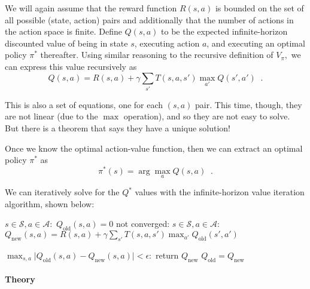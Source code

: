 We will again assume that the reward function $R(s,a)$ is bounded on the
set of all possible (state, action) pairs and additionally that the number
of actions in the action space is finite.
Define $Q(s, a)$ to be the expected infinite-horizon discounted
value of being in state $s$, executing action $a$, and executing
an optimal policy $\pi^*$ thereafter. Using similar reasoning to the
recursive definition of $V_\pi,$ we can express this value
recursively as
\begin{equation}
  Q(s, a) = R(s, a) + \gamma\sum_{s'}T(s, a, s')\max_{a'}Q(s',
  a') \;\;.
\end{equation}

This is also a set of equations, one for each $(s, a)$ pair.  This
time, though, they are not linear (due to the $\max$ operation), and so
they are not easy to solve.  But there is a theorem that says they
have a unique solution!

Once we know the optimal action-value function, then we can extract an
optimal policy $\pi^*$ as
\begin{equation}
  \pi^*(s) = \arg\max_{a}Q(s, a) \;\;.
\end{equation}

We can iteratively solve for the $Q^*$ values with the
infinite-horizon value iteration algorithm, shown below:

\begin{codebox}
  \li     \For $s \in \mathcal{S}, a \in \mathcal{A}:$
  \Do
  \li        $Q_{\text{old}}(s, a) = 0$
  \End
  \li     \While not converged:
  \Do
  \li        \For $s \in \mathcal{S}, a \in \mathcal{A}:$
  \Do
  \li           $Q_{\text{new}}(s, a) = R(s, a) + \gamma\sum_{s'}T(s, a, s')\max_{a'}Q_{\text{old}}(s', a')$
  \End

  \li      \If $\max_{s, a}\lvert Q_{\text{old}}(s, a) - Q_{\text{new}}(s, a)\rvert < \epsilon:$
  \Do
  \li           return $Q_{\text{new}}$
  \End
  \li      $Q_{\text{old}} = Q_{\text{new}}$
  \End
\end{codebox}

\paragraph*{Theory}

